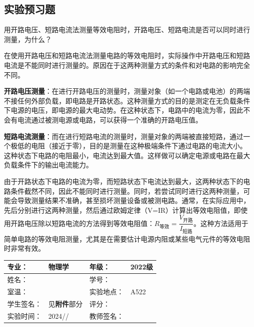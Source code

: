 \documentclass[dvipsnames, svgnames,a4paper,11pt]{article}
\begin{document}
	
	
	\subsection{实验预习题}
	
\begin{question}
	用开路电压、短路电流法测量等效电阻时，开路电压、短路电流是否可以同时进行测量，为什么？
\end{question}

在使用开路电压和短路电流法测量电路的等效电阻时，实际操作中开路电压和短路电流是不能同时进行测量的。原因在于这两种测量方式的条件和对电路的影响完全不同。

\textbf{开路电压测量}：在进行开路电压的测量时，测量对象（如一个电路或电池）的两端不接任何外部负载，即电路是开路状态。这种测量方式的目的是测定在无负载条件下电源的电压，即电源的最大电动势。在这种状态下，电路中的电流为零，因此不会有电流通过被测电源或电路，可以获得一个准确的开路电压值。

\textbf{短路电流测量}：而在进行短路电流的测量时，测量对象的两端被直接短路，通过一个极低的电阻（接近于零），目的是测量在这种极端条件下通过电路的电流大小。这种状态下电路的电阻最小，电流达到最大值。这样做可以确定电源或电路在最大负载条件下的输出电流能力。

由于开路状态下电路的电流为零，而短路状态下电流达到最大，这两种状态下的电路条件截然不同，因此不能同时进行测量。同时，若尝试同时进行这两种测量，可能会导致测量结果不准确，甚至损坏测量设备或被测电路。通常，在实际应用中，先后分别进行这两种测量，然后通过欧姆定律（V=IR）计算出等效电阻值，即使用开路电压除以短路电流的方法得到等效电阻值：$ R_{\text{等效}} = \dfrac{V_{\text{开路}}}{I_{\text{短路}}} $。这种方法适用于简单电路的等效电阻测量，尤其是在需要估计电源内阻或某些电气元件的等效电阻时非常有效。
	
	
	\clearpage
	
	\begin{table}
		\renewcommand\arraystretch{1.7}
		\centering
		\begin{tabularx}{\textwidth}{|X|X|X|X|}
			\hline
			专业： & 物理学 & 年级： & 2022级 \\
			\hline
			姓名： &  & 学号： & \\
			\hline
			室温： &  & 实验地点： & A522 \\
			\hline
			学生签名：& 见\textbf{附件}部分 & 评分： &\\
			\hline
			实验时间：& 2024// & 教师签名：&\\
			\hline
		\end{tabularx}
	\end{table}
	
\end{document}
